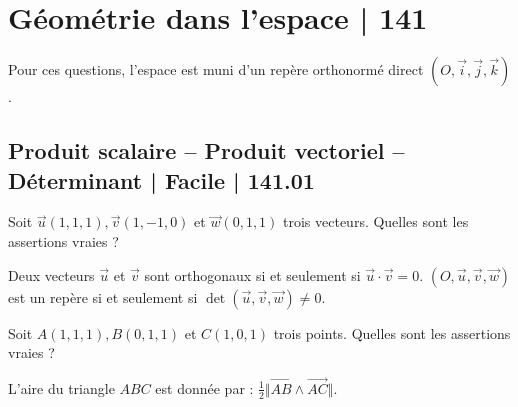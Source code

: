 



\section{Géométrie dans l'espace | 141}

Pour ces questions, l'espace est muni d'un repère orthonormé direct  $(O, \vec{i}, \vec{j}, \vec{k})$.

\subsection{Produit scalaire -- Produit vectoriel -- Déterminant | Facile | 141.01}

 
 
\begin{question} 
Soit $\vec{u}(1,1,1), \vec{v}(1,-1,0)$ et $\vec{w}(0,1,1)$ trois vecteurs. Quelles sont les assertions vraies ?
\begin{answers}



\end{answers}
\begin{explanations}
Deux vecteurs $\vec{u}$ et $\vec{v}$ sont orthogonaux si et seulement si $ \vec{u} \cdot \vec{v}=0$.
 $(O,\vec{u},\vec{v},\vec{w})$ est un repère si et seulement si $\det (\vec{u},\vec{v},\vec{w}) \neq 0$.
\end{explanations}

\end{question}


\begin{question} 
Soit $A(1,1,1), B(0,1,1)$ et $C(1,0,1)$ trois points. Quelles sont les assertions vraies ?
\begin{answers}



\end{answers}
\begin{explanations}
L'aire du triangle $ABC$ est donnée par : $\frac{1}{2} \Vert \overrightarrow{AB} \wedge \overrightarrow{AC} \Vert$. 
\end{explanations}

\end{question}




